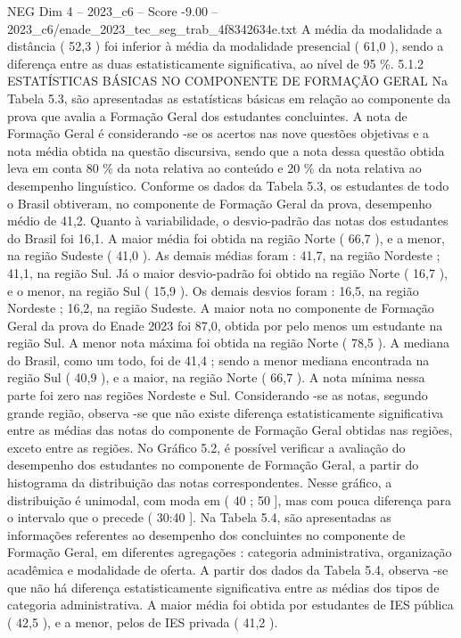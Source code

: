\begin{textsample}{NEG Dim 4 – 2023\_c6 – Score -9.00 – 2023\_c6/enade\_2023\_tec\_seg\_trab\_4f8342634e.txt}
A média da modalidade a distância ( 52,3 ) foi inferior à média da modalidade presencial ( 61,0 ), sendo a diferença entre as duas estatisticamente significativa, ao nível de 95 \%. 5.1.2 ESTATÍSTICAS BÁSICAS NO COMPONENTE DE FORMAÇÃO GERAL Na Tabela 5.3, são apresentadas as estatísticas básicas em relação ao componente da prova que avalia a Formação Geral dos estudantes concluintes.
A nota de Formação Geral é considerando -se os acertos nas nove questões objetivas e a nota média obtida na questão discursiva, sendo que a nota dessa questão obtida leva em conta 80 \% da nota relativa ao conteúdo e 20 \% da nota relativa ao desempenho linguístico.
Conforme os dados da Tabela 5.3, os estudantes de todo o Brasil obtiveram, no componente de Formação Geral da prova, desempenho médio de 41,2.
Quanto à variabilidade, o desvio-padrão das notas dos estudantes do Brasil foi 16,1.
A maior média foi obtida na região Norte ( 66,7 ), e a menor, na região Sudeste ( 41,0 ).
As demais médias foram : 41,7, na região Nordeste ; 41,1, na região Sul.
Já o maior desvio-padrão foi obtido na região Norte ( 16,7 ), e o menor, na região Sul ( 15,9 ).
Os demais desvios foram : 16,5, na região Nordeste ; 16,2, na região Sudeste.
A maior nota no componente de Formação Geral da prova do Enade 2023 foi 87,0, obtida por pelo menos um estudante na região Sul.
A menor nota máxima foi obtida na região Norte ( 78,5 ).
A mediana do Brasil, como um todo, foi de 41,4 ; sendo a menor mediana encontrada na região Sul ( 40,9 ), e a maior, na região Norte ( 66,7 ).
A nota mínima nessa parte foi zero nas regiões Nordeste e Sul.
Considerando -se as notas, segundo grande região, observa -se que não existe diferença estatisticamente significativa entre as médias das notas do componente de Formação Geral obtidas nas regiões, exceto entre as regiões.
No Gráfico 5.2, é possível verificar a avaliação do desempenho dos estudantes no componente de Formação Geral, a partir do histograma da distribuição das notas correspondentes.
Nesse gráfico, a distribuição é unimodal, com moda em ( 40 ; 50 ], mas com pouca diferença para o intervalo que o precede ( 30:40 ].
Na Tabela 5.4, são apresentadas as informações referentes ao desempenho dos concluintes no componente de Formação Geral, em diferentes agregações : categoria administrativa, organização acadêmica e modalidade de oferta.
A partir dos dados da Tabela 5.4, observa -se que não há diferença estatisticamente significativa entre as médias dos tipos de categoria administrativa.
A maior média foi obtida por estudantes de IES pública ( 42,5 ), e a menor, pelos de IES privada ( 41,2 ).

\end{textsample}
